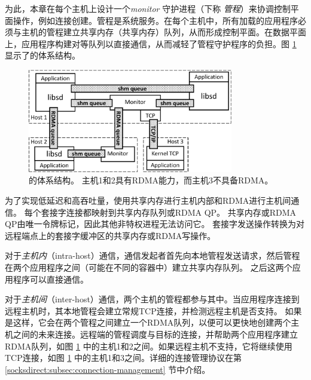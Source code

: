 为此，本章在每个主机上设计一个\emph {monitor} 守护进程（下称 \textit{管程}）来协调控制平面操作，例如连接创建。管程是系统服务。在每个主机中，所有加载\libipc {}的应用程序必须与主机的管程建立共享内存（共享内存）队列，从而形成控制平面。在数据平面上，应用程序构建对等队列以直接通信，从而减轻了管程守护程序的负担。图 \ref {socksdirect:fig:architecture} 显示了\sys {}的体系结构。


\begin{figure}[htbp]
	\centering
	\includegraphics[width=0.8\textwidth]{images/architecture_new}
	\caption{\sys {}的体系结构。 主机1和2具有RDMA能力，而主机3不具备RDMA。}
	\label{socksdirect:fig:architecture}
\end{figure}



为了实现低延迟和高吞吐量，\sys {}使用共享内存进行主机内部和RDMA进行主机间通信。
每个套接字连接都映射到共享内存队列或RDMA QP。
共享内存或RDMA QP由唯一令牌标记，因此其他非特权进程无法访问它。
套接字发送操作转换为对远程端点上的套接字缓冲区的共享内存或RDMA写操作。

对于\emph {主机内}（intra-host）通信，通信发起者首先向本地管程发送请求，然后管程在两个应用程序之间（可能在不同的容器中）建立共享内存队列。 之后这两个应用程序可以直接通信。



对于\emph {主机间}（inter-host）通信，两个主机的管程都参与其中。当应用程序连接到远程主机时，其本地管程会建立常规TCP连接，并检测远程主机是否支持\sys {}。
如果是这样，它会在两个管程之间建立一个RDMA队列，以便可以更快地创建两个主机之间的未来连接。远程端的管程调度与目标的连接，并帮助两个应用程序建立RDMA队列，如图 \ref {socksdirect:fig:architecture} 中的主机1和2之间。如果远程主机不支持\sys {}，它将继续使用TCP连接，如图 \ref {socksdirect:fig:architecture} 中的主机1和3之间。详细的连接管理协议在第 \ref {socksdirect:subsec:connection-management} 节中介绍。

